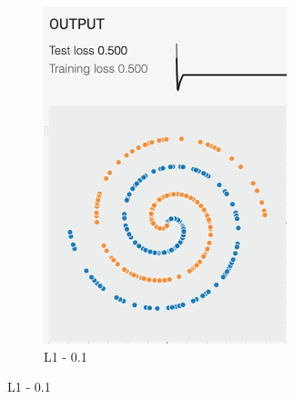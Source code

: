 \documentclass[12pt,a4paper]{article}
\begin{document}
\begin{enumerate}
\begin{figure}[H]
\begin{subfigure}[H]{0.2\textwidth}
				\includegraphics[width=\textwidth]{Figures/reg/L01}
				\caption{L1 - 0.1}
			\end{subfigure}
		\end{figure}
		\vspace{-0.7cm}
			\begin{figure}[H]
			\centering
			\begin{subfigure}[H]{0.2\textwidth}
				\centering

\end{subfigure}
\end{figure}
\end{enumerate}
\end{document}
